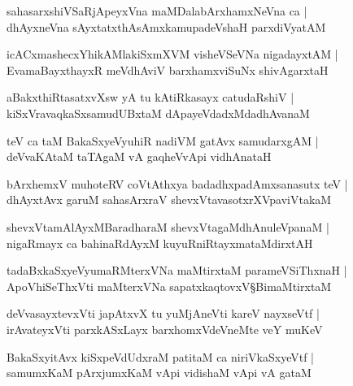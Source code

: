 \begin{shloka}
sahasarxshiVSaRjApeyxVna maMDalabArxhamxNeVna ca |\\
dhAyxneVna sAyxtatxthAsAmxkamupadeVshaH parxdiVyatAM 
\end{shloka}

\begin{shloka}
icACxmashecxYhikAMlakiSxmXVM visheVSeVNa nigadayxtAM |\\
EvamaBayxthayxR meVdhAviV barxhamxviSuNx shivAgarxtaH 
\end{shloka}

\begin{shloka}
aBakxthiRtasatxvXsw yA tu kAtiRkasayx catudaRshiV |\\
kiSxVravaqkaSxsamudUBxtaM dApayeVdadxMdadhAvanaM 
\end{shloka}

\begin{shloka}
teV ca taM BakaSxyeVyuhiR nadiVM gatAvx samudarxgAM |\\
deVvaKAtaM taTAgaM vA gaqheVvApi vidhAnataH
\end{shloka}

\begin{shloka}
bArxhemxV muhoteRV coVtAthxya badadhxpadAmxsanasutx teV |\\
dhAyxtAvx garuM sahasArxraV shevxVtavasotxrXVpaviVtakaM 
\end{shloka}

\begin{shloka}
shevxVtamAlAyxMBaradharaM shevxVtagaMdhAnuleVpanaM |\\
nigaRmayx ca bahinaRdAyxM kuyuRniRtayxmataMdirxtAH 
\end{shloka}

\begin{shloka}
tadaBxkaSxyeVyumaRMterxVNa maMtirxtaM parameVSiThxnaH |\\
ApoVhiSeThxVti maMterxVNa sapatxkaqtovxV\S BimaMtirxtaM 
\end{shloka}

\begin{shloka}
deVvasayxtevxVti japAtxvX tu yuMjAneVti kareV nayxseVtf |\\
irAvateyxVti parxkASxLayx barxhomxVdeVneMte veY muKeV 
\end{shloka}

\begin{shloka}
BakaSxyitAvx kiSxpeVdUdxraM patitaM ca niriVkaSxyeVtf |\\
samumxKaM pArxjumxKaM vApi vidishaM vApi vA gataM 
\end{shloka}

